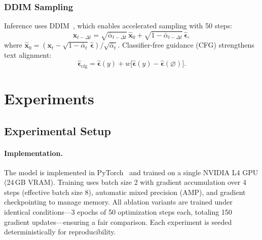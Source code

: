 \documentclass{ieeeaccess}
\begin{document}
\subsubsection{DDIM Sampling}

Inference uses DDIM~\cite{song2020denoising}, which enables accelerated sampling with 50 steps:
\begin{equation}
    \mathbf{x}_{t-\Delta t} = \sqrt{\bar{\alpha}_{t-\Delta t}} \, \hat{\mathbf{x}}_0 + \sqrt{1-\bar{\alpha}_{t-\Delta t}} \, \hat{\boldsymbol{\epsilon}},
\end{equation}
where $\hat{\mathbf{x}}_0 = (\mathbf{x}_t - \sqrt{1-\bar{\alpha}_t}\,\hat{\boldsymbol{\epsilon}})/\sqrt{\bar{\alpha}_t}$. Classifier-free guidance (CFG) strengthens text alignment:
\begin{equation}
    \hat{\boldsymbol{\epsilon}}_\mathrm{cfg} = \hat{\boldsymbol{\epsilon}}(y) + w \bigl[\hat{\boldsymbol{\epsilon}}(y) - \hat{\boldsymbol{\epsilon}}(\varnothing)\bigr].
\end{equation}

\section{Experiments}
\label{sec:experiments}

\subsection{Experimental Setup}

\paragraph{Implementation.} The model is implemented in PyTorch~\cite{paszke2019pytorch} and trained on a single NVIDIA L4 GPU (24\,GB VRAM). Training uses batch size 2 with gradient accumulation over 4 steps (effective batch size 8), automatic mixed precision (AMP), and gradient checkpointing to manage memory. All ablation variants are trained under identical conditions---3 epochs of 50 optimization steps each, totaling 150 gradient updates---ensuring a fair comparison. Each experiment is seeded deterministically for reproducibility.
\end{document}
